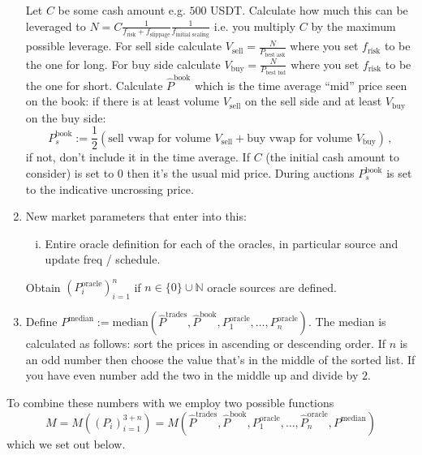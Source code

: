 \documentclass[10pt]{article}
\begin{document}
\begin{enumerate}
Let $C$ be some cash amount e.g. $500$ USDT. 
Calculate how much this can be leveraged to $N = C\frac{1}{f_{\text{risk}} + f_{\text{slippage}}} \frac{1}{f_{\text{initial scaling}}}$ i.e. you multiply $C$ by the maximum possible leverage.
For sell side calculate $V_{\text{sell}} = \frac{N}{P_{\text{best ask}}}$ where you set $f_{\text{risk}}$ to be the one for long. 
For buy side calculate $V_{\text{buy}} = \frac{N}{P_{\text{best bid}}}$ where you set $f_{\text{risk}}$ to be the one for short. 
Calculate $\hat P^{\text{book}}$ which is the time average ``mid'' price seen on the book: if there is at least volume $V_{\text{sell}}$ on the sell side and at least $V_{\text{buy}}$ on the buy side:
\[
P^{\text{book}}_s :=
\frac12 \left(\text{sell vwap for volume $V_{\text{sell}}$}+\text{buy vwap for volume $V_{\text{buy}}$}\right)\,,
\]
if not, don't include it in the time average. 
If $C$ (the initial cash amount to consider) is set to $0$ then it's the usual mid price.
During auctions $P^{\text{book}}_s$ is set to the indicative uncrossing price.

\item 
New market parameters that enter into this:
\begin{enumerate}[i)]
\item Entire oracle definition for each of the oracles, in particular source and update freq / schedule. 
\end{enumerate}

Obtain $(P^{\text{oracle}}_i)_{i=1}^n$ if $n \in \{0\}\cup \mathbb N$ oracle sources are defined.
\item Define $P^{\text{median}}:= \text{median}(\hat P^{\text{trades}}, \hat P^{\text{book}}, P^{\text{oracle}}_1, \ldots, P^{\text{oracle}}_n)$. 
The median is calculated as follows: sort the prices in ascending or descending order. If $n$ is an odd number then choose the value that's in the middle of the sorted list. If you have even number add the two in the middle up and divide by $2$.
\end{enumerate}
To combine these numbers with we employ two possible functions 
\[
M=M((P_i)_{i=1}^{3+n}) = M(\hat P^{\text{trades}}, \hat P^{\text{book}}, P^{\text{oracle}}_1,\ldots,\hat P^{\text{oracle}}_n,P^{\text{median}})
\] 
which we set out below. 
\end{document}
